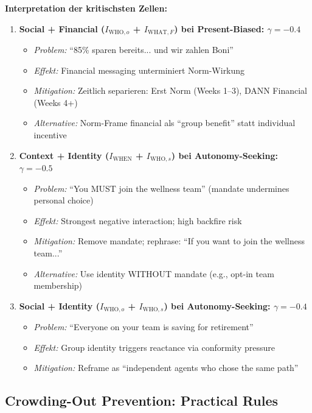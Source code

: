 \textbf{Interpretation der kritischsten Zellen:}

\begin{enumerate}
\item \textbf{Social + Financial ($I_{\text{WHO},o}$ + $I_{\text{WHAT},F}$) bei Present-Biased: $\gamma = -0.4$}
  \begin{itemize}[nosep]
  \item \textit{Problem:} ``85\% sparen bereits... und wir zahlen Boni''
  \item \textit{Effekt:} Financial messaging unterminiert Norm-Wirkung
  \item \textit{Mitigation:} Zeitlich separieren: Erst Norm (Weeks 1--3), DANN Financial (Weeks 4+)
  \item \textit{Alternative:} Norm-Frame financial als ``group benefit'' statt individual incentive
  \end{itemize}

\item \textbf{Context + Identity ($I_{\text{WHEN}}$ + $I_{\text{WHO},s}$) bei Autonomy-Seeking: $\gamma = -0.5$}
  \begin{itemize}[nosep]
  \item \textit{Problem:} ``You MUST join the wellness team'' (mandate undermines personal choice)
  \item \textit{Effekt:} Strongest negative interaction; high backfire risk
  \item \textit{Mitigation:} Remove mandate; rephrase: ``If you want to join the wellness team...''
  \item \textit{Alternative:} Use identity WITHOUT mandate (e.g., opt-in team membership)
  \end{itemize}

\item \textbf{Social + Identity ($I_{\text{WHO},o}$ + $I_{\text{WHO},s}$) bei Autonomy-Seeking: $\gamma = -0.4$}
  \begin{itemize}[nosep]
  \item \textit{Problem:} ``Everyone on your team is saving for retirement''
  \item \textit{Effekt:} Group identity triggers reactance via conformity pressure
  \item \textit{Mitigation:} Reframe as ``independent agents who chose the same path''
  \end{itemize}
\end{enumerate}

\subsection{Crowding-Out Prevention: Practical Rules}

